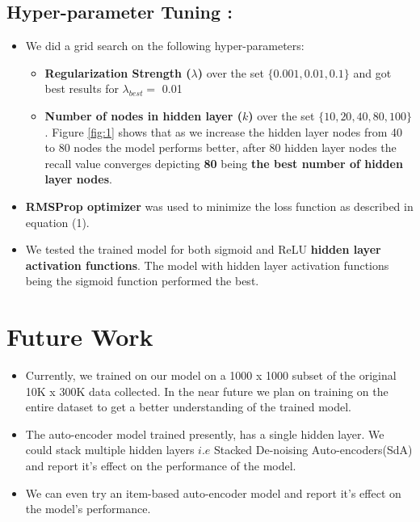 \documentclass[conference]{IEEEtran}
\begin{document}
\subsection*{Hyper-parameter Tuning :}
\begin{itemize}
    \item We did a grid search on the following hyper-parameters:
        \begin{itemize}
            \item \textbf{Regularization Strength ($\lambda$)} over the set  $\{0.001, 0.01, 0.1\}$ and got best results for $\lambda_{best} = $ 0.01
            \item \textbf{Number of nodes in hidden layer ($k$)} over the set  $\{10, 20, 40, 80, 100\}$. Figure \ref{fig:1} shows that as we increase the hidden layer nodes from 40 to 80 nodes the model performs better, after 80 hidden layer nodes the recall value converges depicting \textbf{80} being \textbf{the best number of hidden layer nodes}.
        \end{itemize}
    \item \textbf{RMSProp optimizer} was used to minimize the loss function as described in equation (1).
    \item  We tested the trained model for both sigmoid and ReLU \textbf{hidden layer activation functions}. The model with hidden layer activation functions being the sigmoid function performed the best.
\end{itemize}

\section{\textbf{Future Work}}
\begin{itemize}
    \item Currently, we trained on our model on a 1000 x 1000 subset of the original 10K x 300K data collected. In the near future we plan on training on the entire dataset to get a better understanding of the trained model.
    \item  The auto-encoder model trained presently, has a single hidden layer. We could stack multiple hidden layers $i.e$ Stacked De-noising Auto-encoders(SdA) and report it's effect on the performance of the model.
    \item We can even try an item-based auto-encoder model and report it's effect on the model's performance.
\end{itemize}

\ifCLASSOPTIONcaptionsoff
  \newpage
\fi
\end{document}
